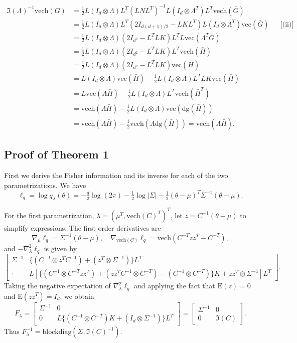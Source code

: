 \documentclass{statsoc}
\newcommand\E{{\text{E}}}
\newcommand\dg{{\text{dg}}}
\newcommand\blockdiag{{\text{blockdiag}}}
\newcommand{\vc}{\text{vec}}
\newcommand{\vech}{\text{vech}}
\newcommand{\dH}{\bar{\bar{H}}}
\begin{document}
\begin{align*}
\mathfrak{I}(\Lambda)^{-1} \vech(G)  &= \tfrac{1}{2}L ( I_d \otimes \Lambda) L^T(L N L^T)^{-1}L (I_d \otimes \Lambda^T) L^T\vech( \bar{G})  \\
&= \tfrac{1}{2}L ( I_d \otimes \Lambda) L^T(2I_{d(d+1)/2} -LKL^T) L (I_d \otimes \Lambda^T) \vc(\bar{G})  && \text{[(ii)]} \\
&= \tfrac{1}{2}L ( I_d \otimes \Lambda)  (2I_{d^2} -L^TLK) L^T L \vc( \Lambda^T \bar{G}) \\
&= \tfrac{1}{2}L ( I_d \otimes \Lambda) (2I_{d^2} -L^TLK) L^T\vech(\bar{H})  \\
& = \tfrac{1}{2}L ( I_d \otimes \Lambda) (2I_{d^2} -L^TLK) \vc(\bar{H})  \\
& = L ( I_d \otimes \Lambda) \vc(\bar{H})  -  \tfrac{1}{2}L ( I_d \otimes \Lambda)  L^TLK \vc(\bar{H})  \\
& = L\vc(\Lambda\bar{H}) - \tfrac{1}{2}L ( I_d \otimes \Lambda)  L^T \vech(\bar{H}^T)  \\
& = \vech(\Lambda\bar{H}) - \tfrac{1}{2}L ( I_d \otimes \Lambda) \vc(\dg (\bar{H}))  \\
& = \vech(\Lambda\bar{H}) - \tfrac{1}{2} \vech(\Lambda\dg (\bar{H}))  
= \vech(\Lambda \dH).
\end{align*}



\subsection{Proof of Theorem 1} 
First we derive the Fisher information and its inverse for each of the two parametrizations. We have 
\[
\ell_q = \log q_\lambda(\theta) = -\tfrac{d}{2} \log(2\pi) - \tfrac{1}{2} \log|\Sigma| - \tfrac{1}{2}(\theta-\mu)^T \Sigma^{-1} (\theta-\mu).
\]

For the first parametrization, $\lambda = (\mu^T , \vech(C)^T )^T$,  let $z = C^{-1} (\theta -\mu)$ to simplify expressions. The first order derivatives are
\[
\nabla_\mu \ell_q = \Sigma^{-1} (\theta - \mu), \quad 
\nabla_{\vech(C)} \ell_q = \vech(C^{-T} z z^T - C^{-T}),
\] 
and $ -\nabla_\lambda^2 \ell_q$ is given by
\[
\begin{bmatrix}
\Sigma^{-1} & \{(C^{-T} \otimes z^T C^{-1}) + (z^T \otimes \Sigma^{-1})\}L^T \\
\cdot  &  L[\{ (C^{-1} \otimes C^{-T} zz^T) + (zz^T C^{-1} \otimes C^{-T}) - (C^{-1} \otimes C^{-T})  \}K + zz^T \otimes \Sigma^{-1}]L^T
\end{bmatrix}.
\]
Taking the negative expectation of $\nabla_\lambda^2 \ell_q$ and applying the fact that $\E(z) = 0$ and $\E(z z^T) = I_d$, we obtain 
\begin{equation*} 
F_\lambda = \begin{bmatrix}
\Sigma^{-1} & 0 \\
0 & L \{  (C^{-1} \otimes C^{-T }) K +  (I_d \otimes \Sigma^{-1}) \}L^T 
\end{bmatrix} =
\begin{bmatrix}
\Sigma^{-1} & 0 \\ 0 & \mathfrak{I}(C)
\end{bmatrix}.
\end{equation*}
Thus $F_\lambda^{-1} = \blockdiag(\Sigma, \mathfrak{I}(C)^{-1})$.
\end{document}
